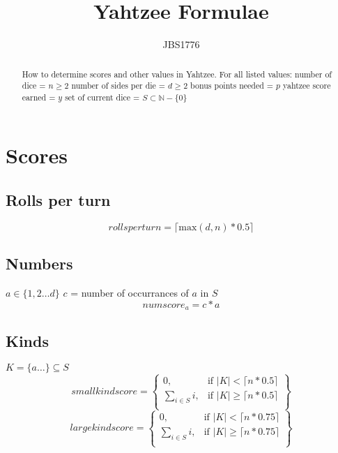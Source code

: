 \documentclass{article}
\begin{document}
\title{Yahtzee Formulae}
\author{JBS1776}

\maketitle

\begin{abstract}
How to determine scores and other values in Yahtzee. \newline
For all listed values: \newline\newline
number of dice =  $n \geq 2$ \newline
number of sides per die = $d \geq 2$ \newline
bonus points needed = $p$ \newline
yahtzee score earned = $y$ \newline
set of current dice = $S \subset \mathbb{N} - \{0\}$ \newline
\end{abstract}

\section{Scores}
\subsection{Rolls per turn}
\begin{equation}
	rollsperturn = \lceil \text {max} (d, n) * 0.5 \rceil
\end{equation}
\subsection{Numbers}
$a \in \{1, 2 \dots d\}$\newline
$c$ = number of occurrances of $a$ in $S$ \newline
\begin{equation}
	numscore_a = c * a
\end{equation}

\subsection{Kinds}
$K = \{a \dots \} \subseteq S$
\begin{equation}
smallkindscore=
\left\{
    \begin{array}{lr}
    0, & \text{if } \lvert K \rvert < \lceil n * 0.5 \rceil\\
    \displaystyle\sum_{i \in S} i, & \text{if } \lvert K \rvert \geq \lceil n * 0.5 \rceil\\
    \end{array}
\right\}
\end{equation}
\begin{equation}
largekindscore=
\left\{
    \begin{array}{lr}
    0, & \text{if } \lvert K \rvert < \lceil n * 0.75 \rceil\\
    \displaystyle\sum_{i \in S} i, & \text{if } \lvert K \rvert \geq \lceil n * 0.75 \rceil\\
    \end{array}
\right\}
\end{equation}
\end{document}
